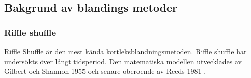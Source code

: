 \documentclass[swedish,a4paper]{article}
\begin{document}
%
%

\subsection{Bakgrund av blandings metoder}

\subsubsection{Riffle shuffle}
\label{sec:riffle_shuffle}
Riffle Shuffle är den mest kända kortleksblandningsmetoden. 
Riffle shuffle har undersökts över långt tidsperiod. Den matematiska modellen
utvecklades av Gilbert och Shannon 1955 och senare oberoende av Reeds 1981 
\parencite[77-79]{gsr2003mathematical}. 
\end{document}
